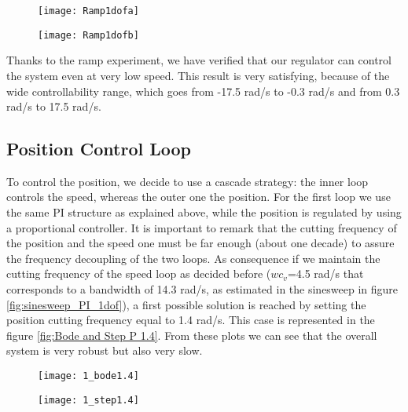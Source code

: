 \begin{figure*}[h]
	\centering
	\begin{subfigure}{0.45\columnwidth}
		\texttt{[image: Ramp1dofa]}
	\end{subfigure}
	\begin{subfigure}{0.45\columnwidth}
		\texttt{[image: Ramp1dofb]}
	\end{subfigure}
	\caption{Ramp experiment from 17 rad/s to 0 rad/s in 100s}
	\label{fig:Ramp1dof}
\end{figure*}

Thanks to the ramp experiment, we have verified that our regulator can control the system even at very low speed. This result is very satisfying, because of the wide controllability range, which goes from -17.5 rad/s to -0.3 rad/s and from 0.3 rad/s to 17.5 rad/s.

\newpage
\subsection{Position Control Loop}
To control the position, we decide to use a cascade strategy: the inner loop controls the speed, whereas the outer one the position. For the first loop we use the same PI structure as explained above, while the position is regulated by using a proportional controller. It is important to remark that the cutting frequency of the position and the speed one must be far enough (about one decade) to assure the frequency decoupling of the two loops. As consequence if we maintain the cutting frequency of the speed loop as decided before ($wc_v$=4.5 rad/s that corresponds to a bandwidth of 14.3 rad/s, as estimated in the sinesweep in figure \ref{fig:sinesweep_PI_1dof}), a first possible solution is reached by setting the position cutting frequency equal to 1.4 rad/s. This case is represented in the figure \ref{fig:Bode and Step P 1.4}. From these plots we can see that the overall system is very robust but also very slow.

\begin{figure*}[h]
	\centering
	\begin{subfigure}{0.45\columnwidth}
		\texttt{[image: 1\_bode1.4]}
	\end{subfigure}
	\begin{subfigure}{0.45\columnwidth}
		\texttt{[image: 1\_step1.4]}
	\end{subfigure}
	\caption{Position control loop with  $wc_{p} $=1.4 rad/s}
	\label{fig:Bode and Step P 1.4}
\end{figure*}

